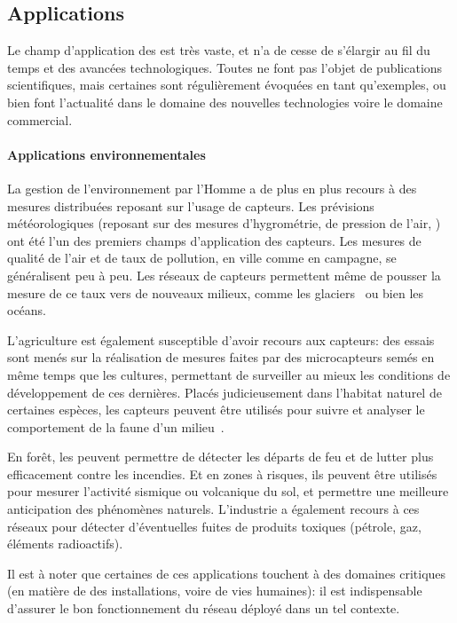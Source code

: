     \subsection{Applications}
Le champ d'application des \WSN est très vaste, et n'a de cesse de s'élargir au fil du temps et des avancées technologiques.
Toutes ne font pas l'objet de publications scientifiques, mais certaines sont régulièrement évoquées en tant qu'exemples, ou bien font l'actualité dans le domaine des nouvelles technologies voire le domaine commercial.

        \paragraph{Applications environnementales}
La gestion de l'environnement par l'Homme a de plus en plus recours à des mesures distribuées reposant sur l'usage de capteurs.
Les prévisions météorologiques (reposant sur des mesures d'hygrométrie, de pression de l'air, \etc) ont été l'un des premiers champs d'application des capteurs.
Les mesures de qualité de l'air et de taux de pollution, en ville comme en campagne, se généralisent peu à peu.
Les réseaux de capteurs permettent même de pousser la mesure de ce taux vers de nouveaux milieux, comme les glaciers~\cite{MPROH05} ou bien les océans.

L'agriculture est également susceptible d'avoir recours aux capteurs: des essais sont menés sur la réalisation de mesures faites par des microcapteurs semés en même temps que les cultures, permettant de surveiller au mieux les conditions de développement de ces dernières.
Placés judicieusement dans l'habitat naturel de certaines espèces, les capteurs peuvent être utilisés pour suivre et analyser le comportement de la faune d'un milieu~\cite{KDA14}.

En forêt, les \rcs peuvent permettre de détecter les départs de feu et de lutter plus efficacement contre les incendies.
Et en zones à risques, ils peuvent être utilisés pour mesurer l'activité sismique ou volcanique du sol, et permettre une meilleure anticipation des phénomènes naturels.
L'industrie a également recours à ces réseaux pour détecter d'éventuelles fuites de produits toxiques (pétrole, gaz, éléments radioactifs).

Il est à noter que certaines de ces applications touchent à des domaines critiques (en matière de \secu des installations, voire de vies humaines): il est indispensable d'assurer le bon fonctionnement du réseau déployé dans un tel contexte.

